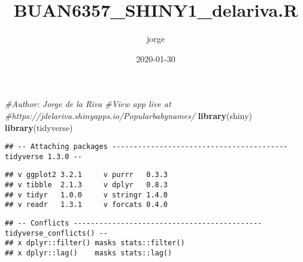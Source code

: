 \documentclass[]{article}
\title{BUAN6357\_SHINY1\_delariva.R}
\author{jorge}
\date{2020-01-30}
\newenvironment{Shaded}{\begin{snugshade}}{\end{snugshade}}
\newcommand{\CommentTok}[1]{\textcolor[rgb]{0.56,0.35,0.01}{\textit{#1}}}
\newcommand{\KeywordTok}[1]{\textcolor[rgb]{0.13,0.29,0.53}{\textbf{#1}}}
\newcommand{\NormalTok}[1]{#1}
\begin{document}
\maketitle

\begin{Shaded}
\begin{Highlighting}[]
\CommentTok{#Author: Jorge de la Riva}
\CommentTok{#View app live at}
\CommentTok{#https://jdelariva.shinyapps.io/Popularbabynames/}
\KeywordTok{library}\NormalTok{(shiny)}
\KeywordTok{library}\NormalTok{(tidyverse)}
\end{Highlighting}
\end{Shaded}

\begin{verbatim}
## -- Attaching packages ----------------------------------------- tidyverse 1.3.0 --
\end{verbatim}

\begin{verbatim}
## v ggplot2 3.2.1     v purrr   0.3.3
## v tibble  2.1.3     v dplyr   0.8.3
## v tidyr   1.0.0     v stringr 1.4.0
## v readr   1.3.1     v forcats 0.4.0
\end{verbatim}

\begin{verbatim}
## -- Conflicts -------------------------------------------- tidyverse_conflicts() --
## x dplyr::filter() masks stats::filter()
## x dplyr::lag()    masks stats::lag()
\end{verbatim}
\end{document}

